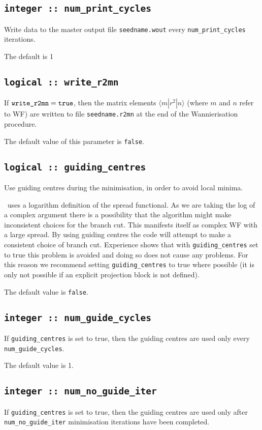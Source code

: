 \subsection[num\_print\_cycles]{\tt integer :: num\_print\_cycles}
Write data to the master output file {\tt seedname.wout} every
\verb#num_print_cycles# iterations.

The default is 1

\subsection[write\_r2mn]{\tt logical :: write\_r2mn}

If $\verb#write_r2mn#=\verb#true#$, then the matrix elements
$\langle m|r^2|n\rangle$ (where $m$ and $n$ refer to WF) are written
to file \verb#seedname.r2mn# at the end of the Wannierisation
procedure.

The default value of this parameter is \verb#false#.


\subsection[guiding\_centres]{\tt logical :: guiding\_centres}
Use guiding centres during the minimisation, in order to avoid
local minima.

\wannier\ uses a logarithm definition of the spread functional. As we are taking the log of a complex argument there is a possibility that the algorithm might make inconsistent choices for the branch cut. This manifests itself as complex WF with a large spread. By using guiding centres the code will attempt to make a consistent choice of branch cut. Experience shows that with \verb#guiding_centres# set to true this problem is avoided and doing so
does not cause any problems. For this reason we recommend setting \verb#guiding_centres# to true where possible (it is only not possible if an explicit projection block is not defined).

The default value is \verb#false#.

\subsection[num\_guide\_cycles]{\tt integer :: num\_guide\_cycles}
If \verb#guiding_centres# is set to true, then the
guiding centres are used only every \verb#num_guide_cycles#.

The default value is 1.

\subsection[num\_no\_guide\_iter]{\tt integer :: num\_no\_guide\_iter}
If \verb#guiding_centres# is set to true, then the
guiding centres are used only after \verb#num_no_guide_iter#
minimisation iterations have been completed.


